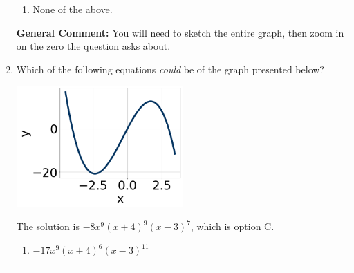 \documentclass{extbook}[14pt]
\newcommand{\litem}[1]{\item #1

\rule{\textwidth}{0.4pt}}
\begin{document}
\begin{enumerate}
{\begin{enumerate}[label=\Alph*.]
\item None of the above.\end{enumerate}
\textbf{General Comment:} You will need to sketch the entire graph, then zoom in on the zero the question asks about.
}
\litem{
Which of the following equations \textit{could} be of the graph presented below?

\begin{center}
    \includegraphics[width=0.5\textwidth]{../Figures/polyGraphToFunctionCopyC.png}
\end{center}


The solution is \( -8x^{9} (x + 4)^{9} (x - 3)^{7} \), which is option C.\begin{enumerate}[label=\Alph*.]
\item \( -17x^{9} (x + 4)^{6} (x - 3)^{11} \)


\end{enumerate}}
\end{enumerate}
\end{document}
